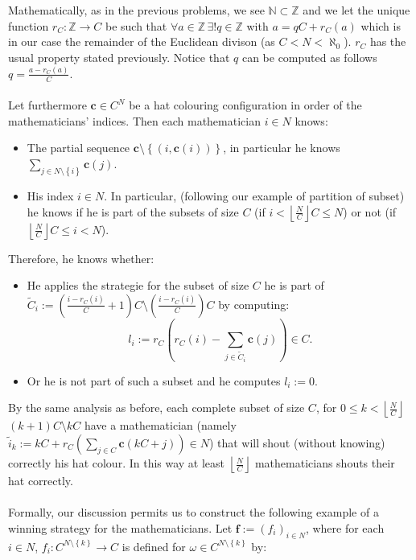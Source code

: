 \documentclass[11pt, a4paper, oneside]{article}
\theoremstyle{remark}
\theoremstyle{lemma}
\begin{document}
\\\\
Mathematically, as in the previous problems, we see \(\mathbb{N} \subset \mathbb{Z}\) and we let the unique function \(r_{C} : \mathbb{Z} \rightarrow C\) be such that \(\forall a \in \mathbb{Z}\, \exists! q \in \mathbb{Z}\) with \(a = qC + r_{C}(a)\) which is in our case the remainder of the Euclidean divison (as $C<N<\aleph_0$). \(r_C\) has the usual property stated previously. Notice that $q$ can be computed as follows $q=\frac{a-r_{C}(a)}{C}$.
\\\\
Let furthermore $\mathbf{c}\in C^{N}$ be a hat colouring configuration in order of the mathematicians' indices. Then each mathematician $i\in N$ knows:
\begin{itemize}
\item The partial sequence \(\mathbf{c} \setminus \left\{(i, \mathbf{c}(i))\right\}\), in particular he knows \(\sum_{j \in N \setminus \left\{i\right\}} \mathbf{c}(j)\).
\item His index $i\in N$. In particular, (following our example of partition of subset) he knows if he is part of the subsets of size $C$ (if $i<\left\lfloor\frac{N}{C}\right\rfloor C\leq N$) or not (if $\left\lfloor\frac{N}{C}\right\rfloor C\leq i<N$).
\end{itemize}
Therefore, he knows whether:
\begin{itemize}
\item He applies the strategie for the subset of size $C$ he is part of $\tilde{C}_i:=\left(\frac{i-r_{C}(i)}{C}+1\right) C\setminus\left(\frac{i-r_{C}(i)}{C}\right)C$ by computing:
$$l_i:=r_{C}\left(r_{C}(i)-\sum_{j\in \tilde{C}_{i}}\mathbf{c}\left(j\right)\right)\in C.$$
\item Or he is not part of such a subset and he computes $l_i:=0$.
\end{itemize}
By the same analysis as before, each complete subset of size $C$, for $0\leq k<\left\lfloor\frac{N}{C}\right\rfloor$ $(k+1)C\setminus kC$ have a mathematician (namely $\tilde{i}_{k}:=kC + r_{C}(\sum_{j\in C}\mathbf{c}(kC+j))\in N$) that will shout (without knowing) correctly his hat colour.
In this way at least $\left\lfloor\frac{N}{C}\right\rfloor$ mathematicians shouts their hat correctly.
\\\\
Formally, our discussion permits us to construct the following example of a winning strategy for the mathematicians. Let \(\mathbf{f} := \left( f_i \right)_{i \in N}\), where for each \(i \in N\), \(f_i: C^{N \setminus \left\{k\right\}} \rightarrow C\) is defined for \(\omega \in C^{N \setminus \left\{k\right\}}\) by:
\end{document}
